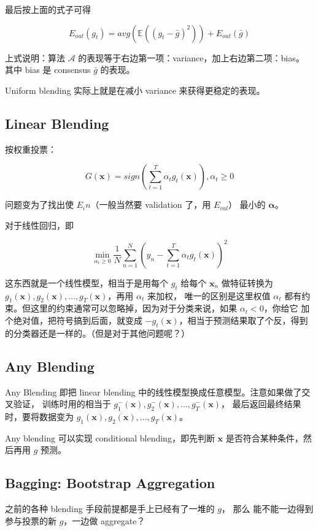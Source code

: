 \documentclass[a4paper]{article}
\begin{document}
最后按上面的式子可得

$$E_{out}(g_t) = avg(\mathbb{E}((g_t - \bar{g})^2)) + E_{out}(\bar{g})$$

上式说明：算法 $\mathcal{A}$ 的表现等于右边第一项：variance，加上右边第二项：bias。
其中 bias 是 consensus $\bar{g}$ 的表现。

Uniform blending 实际上就是在减小 variance 来获得更稳定的表现。


\subsection{Linear Blending}
按权重投票：

$$G(\mathbf{x}) = sign(\sum_{t=1}^{T}\alpha_tg_t(\mathbf{x})), \alpha_t \ge 0$$

问题变为了找出使 $E_in$（一般当然要 validation 了，用 $E_{val}$） 最小的 $\bm{\alpha}$。

对于线性回归，即

$$\operatorname*{min}_{\alpha_t \ge 0}\frac{1}{N}\sum_{n=1}^{N} \left ( y_n - \sum_{t=1}^{T}\alpha_tg_t(\mathbf{x}) \right )^2$$

这东西就是一个线性模型，相当于是用每个 $g_t$ 给每个 $\mathbf{x}_n$ 做特征转换为 ${g_1(\mathbf{x}), g_2(\mathbf{x}), \dots, g_T(\mathbf{x})}$，再用 $\alpha_t$ 来加权，
唯一的区别是这里权值 $\alpha_t$ 都有约束。但这里的约束通常可以忽略掉，因为对于分类来说，如果 $\alpha_t < 0$，你给它
加个绝对值，把符号搞到后面，就变成 $-g_t(\mathbf{x})$，相当于预测结果取了个反，得到的分类器还是一样的。（但是对于其他问题呢？）

\subsection{Any Blending}
Any Blending 即把 linear blending 中的线性模型换成任意模型。注意如果做了交叉验证，
训练时用的相当于 ${g_1^{-}(\mathbf{x}), g_2^{-}(\mathbf{x}), \dots, g_T^{-}(\mathbf{x})}$，
最后返回最终结果时，要将数据变为 ${g_1(\mathbf{x}), g_2(\mathbf{x}), \dots, g_T(\mathbf{x})}$。

Any blending 可以实现 conditional blending，即先判断 $\mathbf{x}$ 是否符合某种条件，然后再用 $g$ 预测。


\subsection{Bagging: Bootstrap Aggregation}
之前的各种 blending 手段前提都是手上已经有了一堆的 $g$，
那么 能不能一边得到参与投票的新  $g$，一边做 aggregate？
\end{document}
